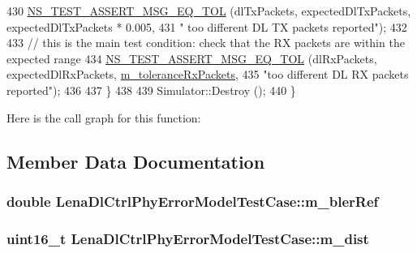 \begin{DoxyCode}
430       \hyperlink{group__testing_ga9e7861b56b4e70db3b56044cb7a28e41}{NS\_TEST\_ASSERT\_MSG\_EQ\_TOL} (dlTxPackets, expectedDlTxPackets, 
      expectedDlTxPackets * 0.005, 
431                                  \textcolor{stringliteral}{" too different DL TX packets reported"});
432 
433       \textcolor{comment}{// this is the main test condition: check that the RX packets are within the expected range}
434       \hyperlink{group__testing_ga9e7861b56b4e70db3b56044cb7a28e41}{NS\_TEST\_ASSERT\_MSG\_EQ\_TOL} (dlRxPackets, expectedDlRxPackets, 
      \hyperlink{classLenaDlCtrlPhyErrorModelTestCase_aeea53cbe22fe11495e338820c8bd1515}{m\_toleranceRxPackets},
435                                  \textcolor{stringliteral}{"too different DL RX packets reported"});
436 
437     \}
438   
439   Simulator::Destroy ();
440 \}
\end{DoxyCode}


Here is the call graph for this function\+:




\subsection{Member Data Documentation}
\subsubsection[{\texorpdfstring{m\+\_\+bler\+Ref}{m_blerRef}}]{\setlength{\rightskip}{0pt plus 5cm}double Lena\+Dl\+Ctrl\+Phy\+Error\+Model\+Test\+Case\+::m\+\_\+bler\+Ref\hspace{0.3cm}{\ttfamily [private]}}\hypertarget{classLenaDlCtrlPhyErrorModelTestCase_a3395f76e96e52bb60a7b0c6a5259019d}{}\label{classLenaDlCtrlPhyErrorModelTestCase_a3395f76e96e52bb60a7b0c6a5259019d}
\subsubsection[{\texorpdfstring{m\+\_\+dist}{m_dist}}]{\setlength{\rightskip}{0pt plus 5cm}uint16\+\_\+t Lena\+Dl\+Ctrl\+Phy\+Error\+Model\+Test\+Case\+::m\+\_\+dist\hspace{0.3cm}{\ttfamily [private]}}\hypertarget{classLenaDlCtrlPhyErrorModelTestCase_aa8b1b44353ecde326522c4cbe599aed1}{}\label{classLenaDlCtrlPhyErrorModelTestCase_aa8b1b44353ecde326522c4cbe599aed1}
